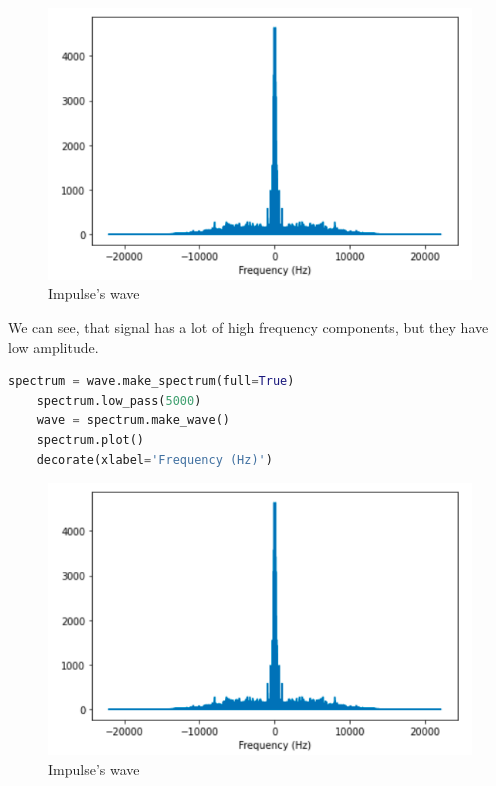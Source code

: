 \documentclass[a4paper]{article}
\begin{document}
        \begin{figure}[H]
            \centering
            \includegraphics[width=\textwidth]{img/p2_1.png}
            \caption{Impulse's wave}
            \label{fig:part1_1_2}
        \end{figure}
        
        We can see, that signal has a lot of high frequency components, but they have low amplitude.
        
        
        \begin{lstlisting}[language=Python,caption=Reading the impulse,label={lst:part1_2}]
    spectrum = wave.make_spectrum(full=True)
    spectrum.low_pass(5000)
    wave = spectrum.make_wave()
    spectrum.plot()
    decorate(xlabel='Frequency (Hz)')
        \end{lstlisting}
        
        \begin{figure}[H]
            \centering
            \includegraphics[width=\textwidth]{img/p2_1.png}
            \caption{Impulse's wave}
            \label{fig:part1_1_2}
        \end{figure}
        
\end{document}
